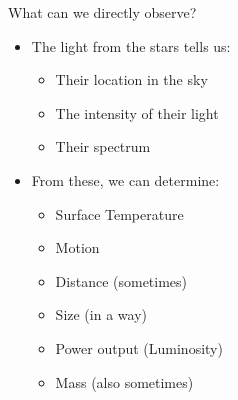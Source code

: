 \documentclass[pdf, aspectratio=169]{beamer}
\begin{document}




\begin{frame}{What can we directly observe?}
  \begin{itemize}
	\item The light from the stars tells us:
	  \begin{itemize}
		\item Their location in the sky
		\item The intensity of their light
		\item Their spectrum
	  \end{itemize}
	\item From these, we can determine:
	  \begin{itemize}
		\item Surface Temperature
		\item Motion
		\item Distance (sometimes)
		\item Size (in a way)
		\item Power output (Luminosity)
		\item Mass (also sometimes)
	  \end{itemize}
  \end{itemize}
\end{frame}
\end{document}
